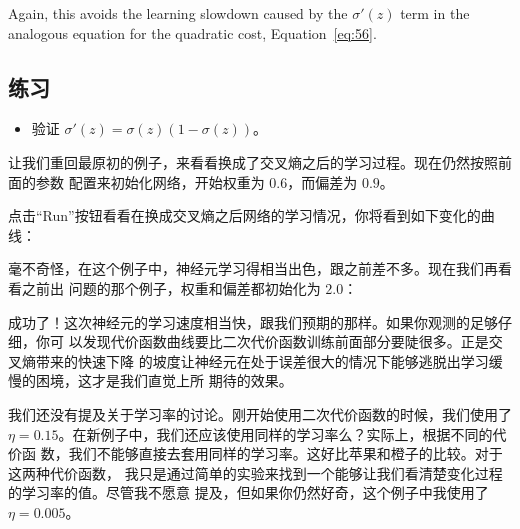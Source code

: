 Again, this avoids the learning slowdown caused by the $\sigma'(z)$ term in the
analogous equation for the quadratic cost, Equation~\eqref{eq:56}.

\subsection*{练习}

\begin{itemize}
\item 验证 $\sigma'(z) = \sigma(z)(1-\sigma(z))$。
\end{itemize}

让我们重回最原初的例子，来看看换成了交叉熵之后的学习过程。现在仍然按照前面的参数
配置来初始化网络，开始权重为 $0.6$，而偏差为 $0.9$。

\begin{center}
\end{center}

点击“Run”按钮看看在换成交叉熵之后网络的学习情况，你将看到如下变化的曲线：


毫不奇怪，在这个例子中，神经元学习得相当出色，跟之前差不多。现在我们再看看之前出
问题的那个例子，权重和偏差都初始化为 $2.0$：

成功了！这次神经元的学习速度相当快，跟我们预期的那样。如果你观测的足够仔细，你可
以发现代价函数曲线要比二次代价函数训练前面部分要陡很多。正是交叉熵带来的快速下降
的坡度让神经元在处于误差很大的情况下能够逃脱出学习缓慢的困境，这才是我们直觉上所
期待的效果。

我们还没有提及关于学习率的讨论。刚开始使用二次代价函数的时候，我们使用了
$\eta = 0.15$。在新例子中，我们还应该使用同样的学习率么？实际上，根据不同的代价函
数，我们不能够直接去套用同样的学习率。这好比苹果和橙子的比较。对于这两种代价函数，
我只是通过简单的实验来找到一个能够让我们看清楚变化过程的学习率的值。尽管我不愿意
提及，但如果你仍然好奇，这个例子中我使用了 $\eta = 0.005$。

